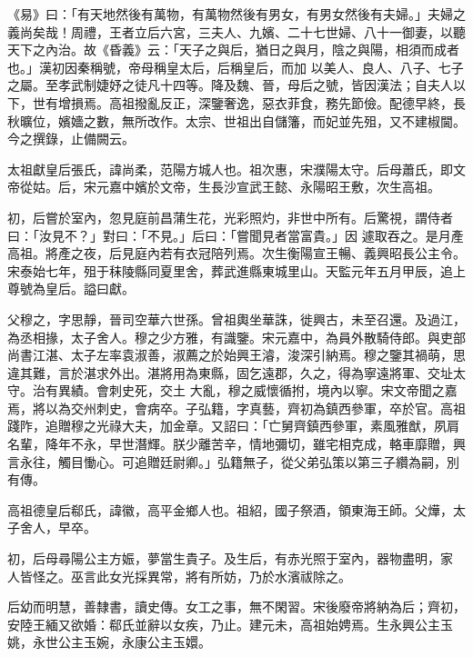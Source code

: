 
\begin{pinyinscope}

 《易》曰：「有天地然後有萬物，有萬物然後有男女，有男女然後有夫婦。」夫婦之義尚矣哉！周禮，王者立后六宮，三夫人、九嬪、二十七世婦、八十一御妻，以聽天下之內治。故《昏義》云：「天子之與后，猶日之與月，陰之與陽，相須而成者也。」漢初因秦稱號，帝母稱皇太后，后稱皇后，而加
 以美人、良人、八子、七子之屬。至孝武制婕妤之徒凡十四等。降及魏、晉，母后之號，皆因漢法；自夫人以下，世有增損焉。高祖撥亂反正，深鑒奢逸，惡衣菲食，務先節儉。配德早終，長秋曠位，嬪嬙之數，無所改作。太宗、世祖出自儲籓，而妃並先殂，又不建椒閫。今之撰錄，止備闕云。



 太祖獻皇后張氏，諱尚柔，范陽方城人也。祖次惠，宋濮陽太守。后母蕭氏，即文帝從姑。后，宋元嘉中嬪於文帝，生長沙宣武王懿、永陽昭王敷，次生高祖。



 初，后嘗於室內，忽見庭前昌蒲生花，光彩照灼，非世中所有。后驚視，謂侍者曰：「汝見不？」對曰：「不見。」后曰：「嘗聞見者當富貴。」因
 遽取吞之。是月產高祖。將產之夜，后見庭內若有衣冠陪列焉。次生衡陽宣王暢、義興昭長公主令。宋泰始七年，殂于秣陵縣同夏里舍，葬武進縣東城里山。天監元年五月甲辰，追上尊號為皇后。謚曰獻。



 父穆之，字思靜，晉司空華六世孫。曾祖輿坐華誅，徙興古，未至召還。及過江，為丞相掾，太子舍人。穆之少方雅，有識鑒。宋元嘉中，為員外散騎侍郎。與吏部尚書江湛、太子左率袁淑善，淑薦之於始興王濬，浚深引納焉。穆之鑒其禍萌，思違其難，言於湛求外出。湛將用為東縣，固乞遠郡，久之，得為寧遠將軍、交址太守。治有異績。會刺史死，交土
 大亂，穆之威懷循拊，境內以寧。宋文帝聞之嘉焉，將以為交州刺史，會病卒。子弘籍，字真藝，齊初為鎮西參軍，卒於官。高祖踐阼，追贈穆之光祿大夫，加金章。又詔曰：「亡舅齊鎮西參軍，素風雅猷，夙肩名輩，降年不永，早世潛輝。朕少離苦辛，情地彌切，雖宅相克成，輅車靡贈，興言永往，觸目慟心。可追贈廷尉卿。」弘籍無子，從父弟弘策以第三子纘為嗣，別有傳。



 高祖德皇后郗氏，諱徽，高平金鄉人也。祖紹，國子祭酒，領東海王師。父燁，太子舍人，早卒。



 初，后母尋陽公主方娠，夢當生貴子。及生后，有赤光照于室內，器物盡明，家
 人皆怪之。巫言此女光採異常，將有所妨，乃於水濱祓除之。



 后幼而明慧，善隸書，讀史傳。女工之事，無不閑習。宋後廢帝將納為后；齊初，安陸王緬又欲婚：郗氏並辭以女疾，乃止。建元未，高祖始娉焉。生永興公主玉姚，永世公主玉婉，永康公主玉嬛。




\end{pinyinscope}
